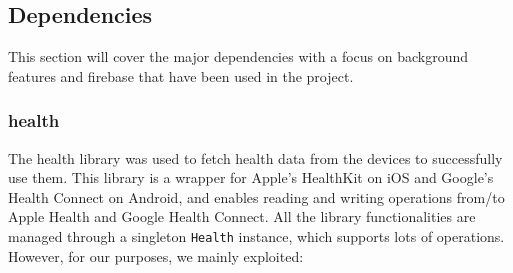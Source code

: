 \subsection{Dependencies}
This section will cover the major dependencies with a focus on background features and firebase that have been used in the project.



\subsubsection{health}
The health library was used to fetch health data from the devices to successfully use them. This library is a wrapper for Apple's HealthKit on iOS and Google's Health Connect on Android, and enables reading and writing operations from/to Apple Health and Google Health Connect. All the library functionalities are managed through a singleton \texttt{Health} instance, which supports lots of operations. \newline However, for our purposes, we mainly exploited: 

